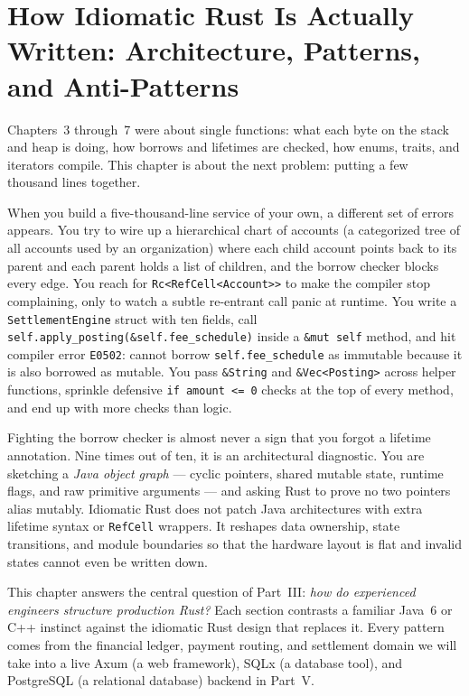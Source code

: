 \chapter{How Idiomatic Rust Is Actually Written: Architecture, Patterns, and Anti-Patterns}
\label{ch08:idiomatic-rust}

Chapters~3 through~7 were about single functions: what each byte on the stack and heap is doing, how borrows and lifetimes are checked, how enums, traits, and iterators compile. This chapter is about the next problem: putting a few thousand lines together.

When you build a five-thousand-line service of your own, a different set of errors appears. You try to wire up a hierarchical chart of accounts (a categorized tree of all accounts used by an organization) where each child account points back to its parent and each parent holds a list of children, and the borrow checker blocks every edge. You reach for \texttt{Rc<RefCell<Account>>} to make the compiler stop complaining, only to watch a subtle re-entrant call panic at runtime. You write a \texttt{SettlementEngine} struct with ten fields, call \texttt{self.\allowbreak{}apply\_posting(\&self.fee\_schedule)} inside a \texttt{\&mut self} method, and hit compiler error \texttt{E0502}: cannot borrow \texttt{self.fee\_schedule} as immutable because it is also borrowed as mutable. You pass \texttt{\&String} and \texttt{\&Vec<Posting>} across helper functions, sprinkle defensive \texttt{if amount <= 0} checks at the top of every method, and end up with more checks than logic.

\begin{intuitionbox}
Fighting the borrow checker is almost never a sign that you forgot a lifetime annotation. Nine times out of ten, it is an architectural diagnostic. You are sketching a \emph{Java object graph} --- cyclic pointers, shared mutable state, runtime flags, and raw primitive arguments --- and asking Rust to prove no two pointers alias mutably. Idiomatic Rust does not patch Java architectures with extra lifetime syntax or \texttt{RefCell} wrappers. It reshapes data ownership, state transitions, and module boundaries so that the hardware layout is flat and invalid states cannot even be written down.
\end{intuitionbox}

This chapter answers the central question of Part~III: \emph{how do experienced engineers structure production Rust?} Each section contrasts a familiar Java~6 or C++ instinct against the idiomatic Rust design that replaces it. Every pattern comes from the financial ledger, payment routing, and settlement domain we will take into a live Axum (a web framework), SQLx (a database tool), and PostgreSQL (a relational database) backend in Part~V.

